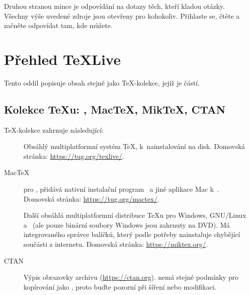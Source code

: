 \documentclass[\classoptions,slovak,english,czech]{\classname}
\newcommand{\ctt}{\url{news:comp.text.tex}}
\newcommand\TKCS{\textsf{\TeX-kolekce}}
\begin{document}
\noindent
Druhou stranou mince je odpovídání na dotazy těch, kteří kladou otázky.
Všechny výše uvedené zdroje jsou otevřeny pro kohokoliv.
Přihlaste se, čtěte a začněte odpovídat tam, kde můžete. 

\section{Přehled \protect\TeX Live}
\label{sec:overview.tl}

Tento oddíl popisuje obsah \TL{} stejně jako \TKCS{}, jejíž je částí.



\subsection{Kolekce \protect\TeX{}u: \protect\TL, Mac\protect\TeX, Mik\protect\TeX, CTAN}
\label{sec:tlcoll-dists}

\DVD{} \TKCS{} zahrnuje následující:

\begin{description}
\item [\TL] Obsáhlý multiplatformní systém \TeX{}, k~nainstalování na disk.
Domovská stránka: \url{https://tug.org/texlive/}.

\item [Mac\TeX] pro \macOS, přidává nativní 
instalační program \macOS\ a jiné aplikace Mac k~\TL{}. Domovská stránka:
\url{https://tug.org/mactex/}.

\item [\MIKTEX] Další obsáhlá multiplatformní distribuce \TeX{}u pro Windows, GNU/Linux a \macOS\ (ale pouze binární soubory Windows
jsou zahrnuty na DVD). Má integrovaného správce balíčků, který podle potřeby nainstaluje chybějící součásti z internetu.
Domovská stránka: \url{https://miktex.org/}.

\item [CTAN] Výpis obrazovky archivu \CTAN{} (\url{https://ctan.org}).
\CTAN{} nemá stejné podmínky pro kopírování jako \TL{}, proto buďte pozorní při šíření nebo modifikaci.

\end{description}
\end{document}
